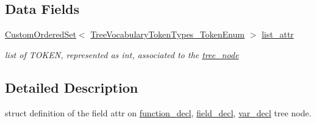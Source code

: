 \subsection*{Data Fields}
\begin{DoxyCompactItemize}
\item 
\hyperlink{classCustomOrderedSet}{Custom\+Ordered\+Set}$<$ \hyperlink{token__interface_8hpp_a14502d0757789149f644966ca931b126}{Tree\+Vocabulary\+Token\+Types\+\_\+\+Token\+Enum} $>$ \hyperlink{structattr_a87486073f129ef3c46e9f9711b5d0559}{list\+\_\+attr}
\begin{DoxyCompactList}\small\item\em list of T\+O\+K\+EN, represented as int, associated to the \hyperlink{classtree__node}{tree\+\_\+node} \end{DoxyCompactList}\end{DoxyCompactItemize}


\subsection{Detailed Description}
struct definition of the field attr on \hyperlink{structfunction__decl}{function\+\_\+decl}, \hyperlink{structfield__decl}{field\+\_\+decl}, \hyperlink{structvar__decl}{var\+\_\+decl} tree node. 

